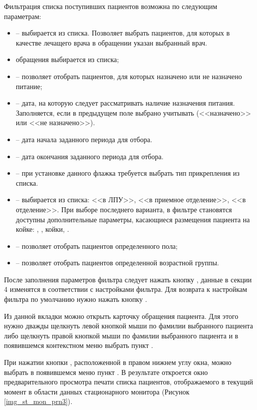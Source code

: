Фильтрация списка поступивших пациентов возможна по следующим параметрам:
\begin{itemize}
 \item {} – выбирается из списка. Позволяет выбрать пациентов, для которых в качестве лечащего врача в обращении указан выбранный врач.
 \item {} обращения выбирается из списка;
 \item {} – позволяет отобрать пациентов, для которых назначено или не назначено питание;
 \item {} – дата, на которую следует рассматривать наличие назначения питания. Заполняется, если в предыдущем поле выбрано учитывать (<<назначено>> или <<не назначено>>).
 \item {} – дата начала заданного периода для отбора.
 \item {} – дата окончания заданного периода для отбора.
 \item {} – при установке данного флажка требуется выбрать тип прикрепления из списка.
 \item {} – выбирается из списка: <<в ЛПУ>>, <<в приемное отделение>>, <<в отделение>>. При выборе последнего варианта, в фильтре становятся доступны дополнительные параметры, касающиеся размещения пациента на койке: , ,  койки, .
 \item {} – позволяет отобрать пациентов определенного пола;
 \item {} – позволяет отобрать пациентов определенной возрастной группы.
\end{itemize}
 
После заполнения параметров фильтра следует нажать кнопку , данные в секции 4 изменятся в соответствии с настройками фильтра. Для возврата к настройкам фильтра по умолчанию нужно нажать кнопку .

Из данной вкладки можно открыть карточку обращения пациента. Для этого нужно дважды щелкнуть левой кнопкой мыши по фамилии выбранного пациента либо щелкнуть правой кнопкой мыши по фамилии выбранного пациента и в появившемся контекстном меню выбрать пункт .

При нажатии кнопки , расположенной в правом нижнем углу окна, можно выбрать в появившемся меню пункт . В результате откроется окно предварительного просмотра печати списка пациентов, отображаемого в текущий момент в области данных стационарного монитора (Рисунок \ref{img_st_mon_prn3}).

